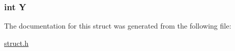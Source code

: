 \subsubsection[{\texorpdfstring{Y}{Y}}]{\setlength{\rightskip}{0pt plus 5cm}int Y}\hypertarget{struct___l_step_aa482c4cc86a24474e4fb19b5b5978778}{}\label{struct___l_step_aa482c4cc86a24474e4fb19b5b5978778}


The documentation for this struct was generated from the following file\+:\begin{DoxyCompactItemize}
\item 
\hyperlink{struct_8h}{struct.\+h}\end{DoxyCompactItemize}
